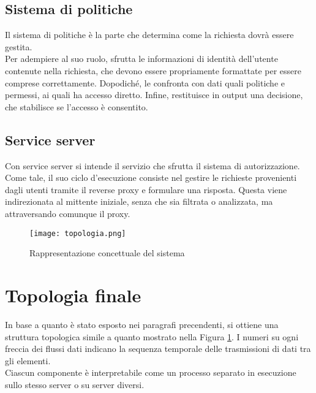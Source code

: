 \subsection{Sistema di politiche}
Il sistema di politiche è la parte che determina come la richiesta dovrà essere gestita. 
\\ Per adempiere al suo ruolo, sfrutta le informazioni di identità dell'utente contenute nella richiesta, che devono essere propriamente formattate per essere comprese correttamente. 
Dopodiché, le confronta con dati quali politiche e permessi, ai quali ha accesso diretto.
Infine, restituisce in output una decisione, che stabilisce se l'accesso è consentito.  

\subsection{Service server} \label{serv_server}
Con service server si intende il servizio che sfrutta il sistema di autorizzazione. Come tale, il suo ciclo d'esecuzione consiste nel gestire 
le richieste provenienti dagli utenti tramite
 il reverse proxy e formulare una risposta.
Questa viene indirezionata al mittente iniziale, senza che sia filtrata o analizzata, ma attraversando comunque il proxy.

\begin{figure}[h]
    \texttt{[image: topologia.png]}
    \centering
    \caption{Rappresentazione concettuale del sistema}
    \label{topologia}
\end{figure}

\section{Topologia finale}
In base a quanto è stato esposto nei paragrafi precendenti, si ottiene una struttura topologica simile a quanto mostrato nella Figura \ref{topologia}. 
I numeri su ogni freccia dei flussi dati indicano la sequenza temporale delle trasmissioni di dati tra gli elementi. 
\\Ciascun componente è interpretabile come un processo separato in esecuzione sullo stesso server o su server diversi. 

